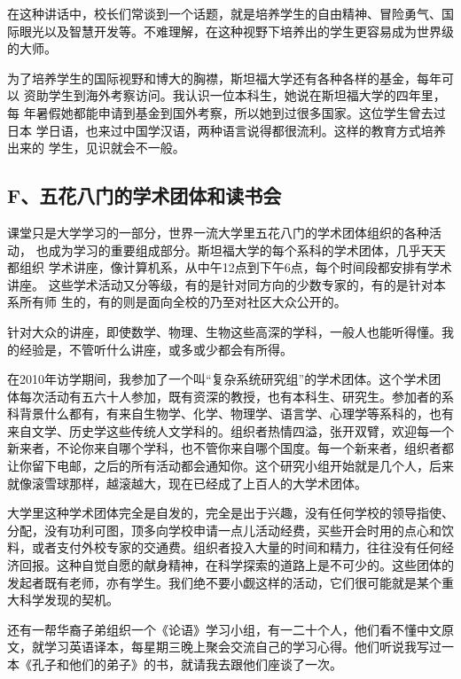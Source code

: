 \documentclass[11pt]{ctexart}
\begin{document}
{{{{在这种讲话中，校长们常谈到一个话题，就是培养学生的自由精神、冒险勇气、国
际眼光以及智慧开发等。不难理解，在这种视野下培养出的学生更容易成为世界级
的大师。


为了培养学生的国际视野和博大的胸襟，斯坦福大学还有各种各样的基金，每年可
以 资助学生到海外考察访问。我认识一位本科生，她说在斯坦福大学的四年里，每
年暑假她都能申请到基金到国外考察，所以她到过很多国家。这位学生曾去过日本
学日语，也来过中国学汉语，两种语言说得都很流利。这样的教育方式培养出来的
学生，见识就会不一般。




\subsection{F、五花八门的学术团体和读书会}
\label{sec:org2666bc7}

课堂只是大学学习的一部分，世界一流大学里五花八门的学术团体组织的各种活动，
也成为学习的重要组成部分。斯坦福大学的每个系科的学术团体，几乎天天都组织
学术讲座，像计算机系，从中午12点到下午6点，每个时间段都安排有学术讲座。
这些学术活动又分等级，有的是针对同方向的少数专家的，有的是针对本系所有师
生的，有的则是面向全校的乃至对社区大众公开的。


针对大众的讲座，即使数学、物理、生物这些高深的学科，一般人也能听得懂。我
的经验是，不管听什么讲座，或多或少都会有所得。


在2010年访学期间，我参加了一个叫“复杂系统研究组”的学术团体。这个学术团
体每次活动有五六十人参加，既有资深的教授，也有本科生、研究生。参加者的系
科背景什么都有，有来自生物学、化学、物理学、语言学、心理学等系科的，也有
来自文学、历史学这些传统人文学科的。组织者热情四溢，张开双臂，欢迎每一个
新来者，不论你来自哪个学科，也不管你来自哪个国度。每一个新来者，组织者都
让你留下电邮，之后的所有活动都会通知你。这个研究小组开始就是几个人，后来
就像滚雪球那样，越滚越大，现在已经成了上百人的大学术团体。


大学里这种学术团体完全是自发的，完全是出于兴趣，没有任何学校的领导指使、
分配，没有功利可图，顶多向学校申请一点儿活动经费，买些开会时用的点心和饮
料，或者支付外校专家的交通费。组织者投入大量的时间和精力，往往没有任何经
济回报。这种自觉自愿的献身精神，在科学探索的道路上是不可少的。这些团体的
发起者既有老师，亦有学生。我们绝不要小觑这样的活动，它们很可能就是某个重
大科学发现的契机。


还有一帮华裔子弟组织一个《论语》学习小组，有一二十个人，他们看不懂中文原
文，就学习英语译本，每星期三晚上聚会交流自己的学习心得。他们听说我写过一
本《孔子和他们的弟子》的书，就请我去跟他们座谈了一次。


}}}}
\end{document}
